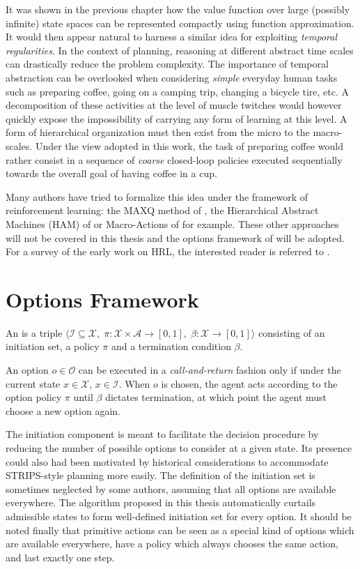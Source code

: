 It was shown in the previous chapter how the value function over large 
(possibly infinite)
state spaces can be represented compactly using function approximation. It would
then appear natural to harness a similar idea for exploiting \textit{temporal
regularities}. In the context of planning, reasoning at different
abstract time scales can drastically reduce the problem complexity.
The importance of temporal abstraction can be overlooked when considering \textit{simple} everyday
human tasks such as preparing coffee, going on a camping trip, changing a bicycle tire,
etc. A decomposition of these activities at the level of muscle twitches would however quickly expose 
the impossibility of carrying any form of learning at this level. A form of hierarchical organization must then exist from the micro to the macro-scales. Under the view adopted in this work, the task of preparing coffee would rather consist in a sequence of \textit{coarse} closed-loop policies executed sequentially towards the overall goal of having coffee in a cup. 

Many authors have tried to formalize this idea under the framework
of reinforcement learning: the \textsc{MAXQ} method of \cite{Dietterich1998}, the Hierarchical
Abstract Machines (HAM) of \cite{Parr1997} or Macro-Actions of \cite{Hauskrecht1998} for
example. These other approaches will not be covered in this thesis and the options framework of 
\cite{Sutton1999} will be adopted. For a survey of the early work on HRL, the
interested reader is referred to \cite{StolleThesis2004, Sutton1999}.

\section{Options Framework}
\begin{defn}
An  is a triple $\langle \mathcal{I} \subseteq \mathcal{X},\;
\mathcal{\pi} : \mathcal{X} \times \mathcal{A} \to [0, 1],\; \beta : \mathcal{X} \to [0, 1]
\rangle$ consisting of an initiation set, a policy $\pi$ and a termination condition
$\beta$.
\end{defn}

An option $o \in \mathcal{O}$ can be executed in a \textit{call-and-return} fashion only if under the current state $x \in \mathcal{X}$, $x \in \mathcal{I}$. When $o$ is chosen, the agent acts according to the option policy $\pi$ until  $\beta$ dictates termination, at which point the agent must choose a new option again.

The initiation component is meant to facilitate the decision procedure by reducing the number of possible options to consider at a given state. Its presence could also had been motivated by  historical considerations to accommodate STRIPS-style planning \parencite{Fikes1972} more easily. The definition of the initiation set is sometimes neglected  by some authors, assuming that all options are available everywhere. The algorithm proposed in this thesis automatically curtails admissible states to form well-defined initiation set for every option. It should be noted finally that primitive actions can be seen as a special kind of options which are available everywhere, have a policy which always chooses the same action, and last exactly one step. 

